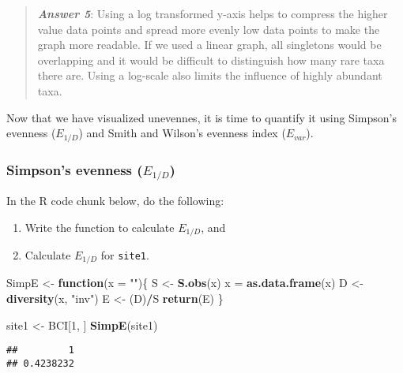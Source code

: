 \documentclass[
]{article}
\newenvironment{Shaded}{\begin{snugshade}}{\end{snugshade}}
\newcommand{\AttributeTok}[1]{\textcolor[rgb]{0.13,0.29,0.53}{#1}}
\newcommand{\ControlFlowTok}[1]{\textcolor[rgb]{0.13,0.29,0.53}{\textbf{#1}}}
\newcommand{\DecValTok}[1]{\textcolor[rgb]{0.00,0.00,0.81}{#1}}
\newcommand{\FunctionTok}[1]{\textcolor[rgb]{0.13,0.29,0.53}{\textbf{#1}}}
\newcommand{\NormalTok}[1]{#1}
\newcommand{\OtherTok}[1]{\textcolor[rgb]{0.56,0.35,0.01}{#1}}
\newcommand{\SpecialCharTok}[1]{\textcolor[rgb]{0.81,0.36,0.00}{\textbf{#1}}}
\newcommand{\StringTok}[1]{\textcolor[rgb]{0.31,0.60,0.02}{#1}}
\begin{document}
\begin{quote}
\textbf{\emph{Answer 5}}: Using a log transformed y-axis helps to
compress the higher value data points and spread more evenly low data
points to make the graph more readable. If we used a linear graph, all
singletons would be overlapping and it would be difficult to distinguish
how many rare taxa there are. Using a log-scale also limits the
influence of highly abundant taxa.
\end{quote}

Now that we have visualized unevennes, it is time to quantify it using
Simpson's evenness (\(E_{1/D}\)) and Smith and Wilson's evenness index
(\(E_{var}\)).

\subsubsection{\texorpdfstring{Simpson's evenness
(\(E_{1/D}\))}{Simpson's evenness (E\_\{1/D\})}}\label{simpsons-evenness-e_1d}

In the R code chunk below, do the following:

\begin{enumerate}
\def\labelenumi{\arabic{enumi}.}
\item
  Write the function to calculate \(E_{1/D}\), and
\item
  Calculate \(E_{1/D}\) for \texttt{site1}.
\end{enumerate}

\begin{Shaded}
\begin{Highlighting}[]
\NormalTok{SimpE }\OtherTok{\textless{}{-}} \ControlFlowTok{function}\NormalTok{(}\AttributeTok{x =} \StringTok{""}\NormalTok{)\{}
\NormalTok{ S }\OtherTok{\textless{}{-}} \FunctionTok{S.obs}\NormalTok{(x)}
\NormalTok{ x }\OtherTok{=} \FunctionTok{as.data.frame}\NormalTok{(x)}
\NormalTok{ D }\OtherTok{\textless{}{-}} \FunctionTok{diversity}\NormalTok{(x, }\StringTok{"inv"}\NormalTok{)}
\NormalTok{ E }\OtherTok{\textless{}{-}}\NormalTok{ (D)}\SpecialCharTok{/}\NormalTok{S}
 \FunctionTok{return}\NormalTok{(E)}
\NormalTok{\}}

\NormalTok{site1 }\OtherTok{\textless{}{-}}\NormalTok{ BCI[}\DecValTok{1}\NormalTok{, ]}
\FunctionTok{SimpE}\NormalTok{(site1)}
\end{Highlighting}
\end{Shaded}

\begin{verbatim}
##         1 
## 0.4238232
\end{verbatim}
\end{document}
